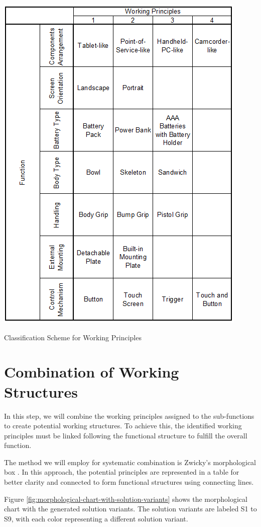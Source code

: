 \begin{table}[H]
    \centering
    \includegraphics[width=0.6\linewidth]{texs/Part1/chapter3/image/stotal.png}
    \caption{Classification Scheme for Working Principles}
    \label{tab:classification-scheme-working-principles}
\end{table}


\section{Combination of Working Structures}
In this step, we will combine the working principles assigned to the sub-functions to create potential working structures. To achieve this, the identified working principles must be linked following the functional structure to fulfill the overall function.

The method we will employ for systematic combination is Zwicky's morphological box \cite{Kushahrin22}. In this approach, the potential principles are represented in a table for better clarity and connected to form functional structures using connecting lines.

Figure \ref{fig:morphological-chart-with-solution-variants} shows the morphological chart with the generated solution variants. The solution variants are labeled S1 to S9, with each color representing a different solution variant.


